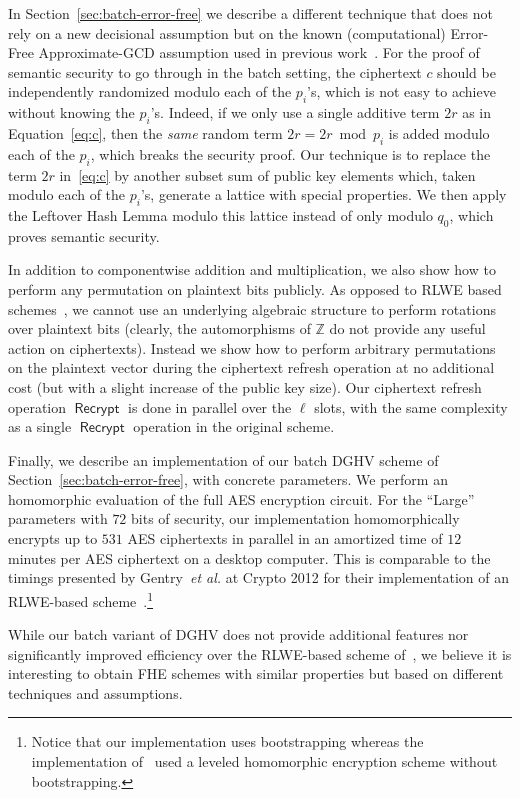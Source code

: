 \documentclass{llncs}
\newcommand{\etal}{\textsl{et al.}\xspace}
\newcommand{\Z}{{\mathbb Z}}
\DeclareMathOperator{\Recrypt}{\ensuremath{\mathsf{Recrypt}}}
\begin{document}
In Section~\ref{sec:batch-error-free} we describe a different
technique that does not rely on a new decisional assumption but on the known  (computational)
Error-Free Approximate-GCD assumption used in previous
work~\cite{vDGHV2010,CMNT2011,CNT2012}. For the proof of semantic 
security to go through in the batch setting, the ciphertext $c$
should be independently randomized modulo each of the $p_i$'s, which is not 
easy to achieve without knowing the $p_i$'s. Indeed, if we only use a 
single additive term $2r$ as in Equation~\eqref{eq:c}, then the \emph{same} random 
term $2r=2r \bmod p_i$ is added modulo each of the $p_i$, which breaks 
the security proof. Our technique is to replace
the term $2r$ in~\eqref{eq:c} by another subset sum of public key elements which, taken
modulo each of the $p_i$'s, generate a lattice with special properties.
We then apply the Leftover Hash Lemma modulo this
lattice instead of only modulo $q_0$, which proves semantic security.

In addition to componentwise addition and multiplication, we also show
how to perform any permutation on plaintext bits publicly. As opposed
to RLWE based schemes~\cite{BGV2012,GHS2012a}, we cannot use an underlying algebraic
structure to perform rotations over plaintext bits (clearly, the
automorphisms of $\Z$ do not provide any useful action on ciphertexts).
Instead we show how to perform arbitrary permutations on the plaintext
vector during the ciphertext refresh operation at no additional cost (but with
a slight increase of the public key size). Our ciphertext refresh
operation $\Recrypt$ is done in parallel over the 
$\ell$ slots, with the same complexity as a single $\Recrypt$
operation in the original scheme.

Finally, we describe an implementation of our batch DGHV scheme of Section~\ref{sec:batch-error-free}, with
concrete parameters. We perform an homomorphic evaluation of
the full AES encryption circuit. For the ``Large'' parameters
with $72$ bits of security, our implementation  homomorphically
encrypts up to  $531$ AES ciphertexts in parallel in an amortized time of $12$
minutes per AES ciphertext on a desktop computer. This is comparable to
the timings presented by Gentry~\etal at Crypto 2012 for their
implementation of an RLWE-based scheme~\cite{GHS2012c}.\footnote{
Notice that our implementation uses bootstrapping whereas the implementation
of~\cite{GHS2012c} used a leveled homomorphic encryption scheme
without bootstrapping.}

While our batch variant of DGHV does not provide additional features nor
significantly improved efficiency over the RLWE-based scheme of~\cite{GHS2012a}, we believe it is interesting to obtain FHE schemes with
similar properties but based on different techniques and assumptions.  
\end{document}
